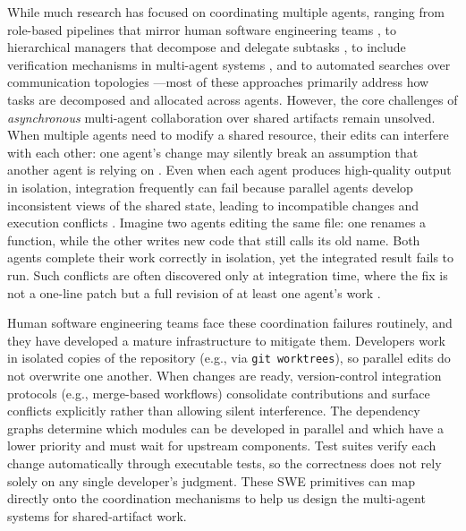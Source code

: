 




While much research has focused on coordinating multiple agents, ranging from role-based pipelines that mirror human software engineering teams \citep{hong2023metagpt,qian2024chatdev}, to hierarchical managers that decompose and delegate subtasks \citep{benkovich2026agyn}, to include verification mechanisms in multi-agent systems \citep{venkataramani2026mas}, and to automated searches over communication topologies \citep{zhang2025multi}---most of these approaches primarily address how tasks are decomposed and allocated across agents.
However, the core challenges of \emph{asynchronous} multi-agent collaboration over shared artifacts remain unsolved. When multiple agents need to modify a shared resource, their edits can interfere with each other: one agent's change may silently break an assumption that another agent is relying on \citep{khatua2026cooperbench}. Even when each agent produces high-quality output in isolation, integration frequently can fail because parallel agents develop inconsistent views of the shared state, leading to incompatible changes and execution conflicts \citep{cemri2025multi}.
Imagine two agents editing the same file: one renames a function, while the other writes new code that still calls its old name. Both agents complete their work correctly in isolation, yet the integrated result fails to run. Such conflicts are often discovered only at integration time, where the fix is not a one-line patch but a full revision of at least one agent's work \citep{cognition2025multiagent}.



Human software engineering teams face these coordination failures routinely, and they have developed a mature infrastructure to mitigate them. Developers work in isolated copies of the repository (e.g., via \texttt{git worktrees}), so parallel edits do not overwrite one another. When changes are ready, version-control integration protocols (e.g., merge-based workflows) consolidate contributions and surface conflicts explicitly rather than allowing silent interference. The dependency graphs determine which modules can be developed in parallel and which have a lower priority and must wait for upstream components. Test suites verify each change automatically through executable tests, so the correctness does not rely solely on any single developer's judgment. 
These SWE primitives can map directly onto the coordination mechanisms to help us design the multi-agent systems for shared-artifact work.

